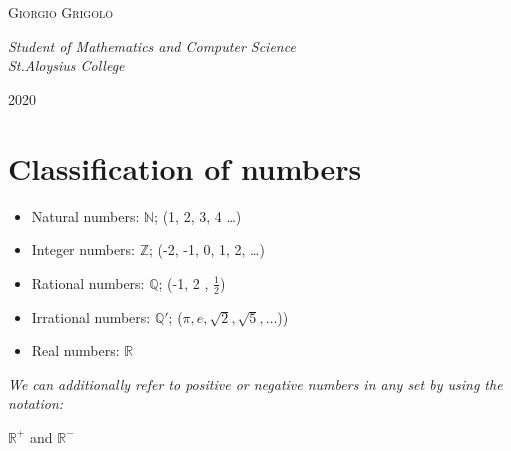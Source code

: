 \documentclass[12pt, a4paper]{report}
\theoremstyle{definition}
\begin{document}
\begin{titlepage}
		{\scshape\Large Giorgio Grigolo \\ } %
		
		\vspace{0.5\baselineskip} %
		
		\textit{Student of Mathematics and Computer Science \\St.Aloysius College } %
		
		\vfill %
		
		
		
		\vspace{0.3\baselineskip} %
		
		2020 %
		
	\end{titlepage}
	\tableofcontents
	\newpage
	\chapter{Classification of numbers}
	
	\begin{itemize}
		\item{Natural numbers: $\mathbb{N}$; (1, 2, 3, 4 \ldots)}
		\item{Integer numbers: $\mathbb{Z}$; (-2, -1, 0, 1, 2, \ldots)}
		\item{Rational numbers: $\mathbb{Q}$; (-1, 2 , $\frac{1}{2}$)}
		\item{Irrational numbers: $\mathbb{Q'}$; ($\pi, e, \sqrt{2}, \sqrt{5}, \ldots$))}
		\item{Real numbers: $\mathbb{R}$}
		\\
	\end{itemize}
	
	
	\emph{We can additionally refer to positive or negative numbers in any set by using the notation:}\\
	\begin{center}
		$\mathbb{R}^+$ and $\mathbb{R}^-$
	\end{center}
	
\end{document}
